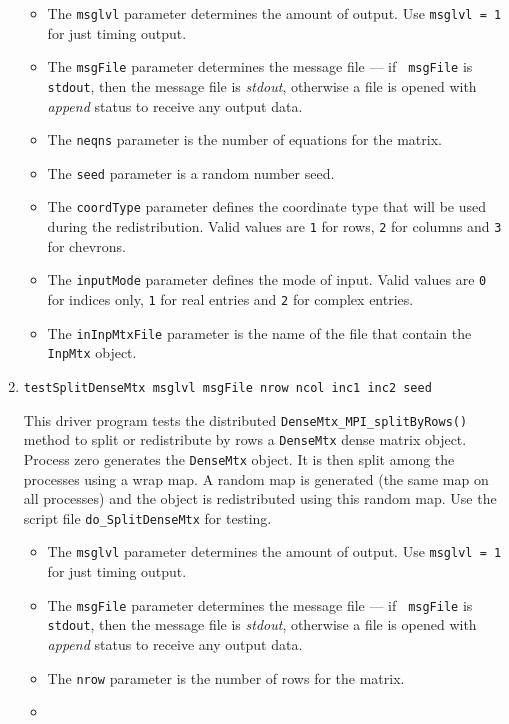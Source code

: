 \begin{enumerate}
\begin{itemize}
\item
The {\tt msglvl} parameter determines the amount of output.
Use {\tt msglvl = 1} for just timing output.
\item
The {\tt msgFile} parameter determines the message file --- if {\tt
msgFile} is {\tt stdout}, then the message file is {\it stdout},
otherwise a file is opened with {\it append} status to receive any
output data.
\item
The {\tt neqns} parameter is the number of equations for the matrix.
\item
The {\tt seed} parameter is a random number seed.
\item
The {\tt coordType} parameter defines the coordinate type that will
be used during the redistribution. Valid values are {\tt 1} for rows,
{\tt 2} for columns and {\tt 3} for chevrons.
\item
The {\tt inputMode} parameter defines the mode of input.
Valid values are {\tt 0} for indices only,
{\tt 1} for real entries 
and {\tt 2} for complex entries.
\item
The {\tt inInpMtxFile} parameter is the name of the file that
contain the {\tt InpMtx} object.
\end{itemize}
\item
\begin{verbatim}
testSplitDenseMtx msglvl msgFile nrow ncol inc1 inc2 seed
\end{verbatim}
This driver program tests the distributed 
{\tt DenseMtx\_MPI\_splitByRows()}
method to split or redistribute by rows
a {\tt DenseMtx} dense matrix object.
Process zero generates the {\tt DenseMtx} object.
It is then split among the processes using a wrap map.
A random map is generated (the same map on all processes) and the
object is redistributed using this random map.
Use the script file {\tt do\_SplitDenseMtx} for testing.
\par
\begin{itemize}
\item
The {\tt msglvl} parameter determines the amount of output.
Use {\tt msglvl = 1} for just timing output.
\item
The {\tt msgFile} parameter determines the message file --- if {\tt
msgFile} is {\tt stdout}, then the message file is {\it stdout},
otherwise a file is opened with {\it append} status to receive any
output data.
\item
The {\tt nrow} parameter is the number of rows for the matrix.
\item

\end{itemize}
\end{enumerate}
